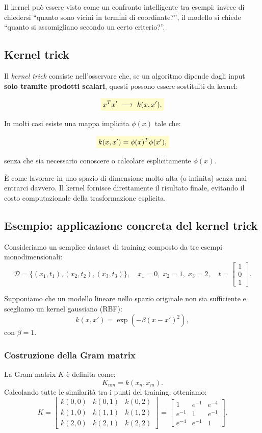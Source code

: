 \documentclass[a4paper,12pt]{report}
\newcommand{\highlight}[1]{%
\colorbox{yellow!20}{$\displaystyle #1$}%
}
\begin{document}
Il kernel può essere visto come un confronto intelligente tra esempi: invece di chiedersi “quanto sono vicini in termini di coordinate?”, il modello si chiede “quanto si assomigliano secondo un certo criterio?”.

\subsection{Kernel trick}

Il \emph{kernel trick} consiste nell’osservare che, se un algoritmo dipende dagli input \textbf{solo tramite prodotti scalari}, questi possono essere sostituiti da kernel:

\[
\highlight{
x^T x' \;\longrightarrow\; k(x,x').}
\]

In molti casi esiste una mappa implicita $\phi(x)$ tale che:

\[
\highlight{
k(x,x') = \phi(x)^T \phi(x'),}
\]

senza che sia necessario conoscere o calcolare esplicitamente $\phi(x)$.

È come lavorare in uno spazio di dimensione molto alta (o infinita) senza mai entrarci davvero. Il kernel fornisce direttamente il risultato finale, evitando il costo computazionale della trasformazione esplicita.

\subsection{Esempio: applicazione concreta del kernel trick}

Consideriamo un semplice dataset di training composto da tre esempi monodimensionali:
\[
\mathcal{D} = \{(x_1,t_1),(x_2,t_2),(x_3,t_3)\},
\quad
x_1=0,\; x_2=1,\; x_3=2,
\quad
t = \begin{bmatrix}1 \\ 0 \\ 1\end{bmatrix}.
\]

Supponiamo che un modello lineare nello spazio originale non sia sufficiente e scegliamo un kernel gaussiano (RBF):
\[
k(x,x') = \exp(-\beta (x-x')^2),
\]
con $\beta=1$.

\subsubsection*{Costruzione della Gram matrix}

La Gram matrix $K$ è definita come:
\[
K_{nm} = k(x_n,x_m).
\]
Calcolando tutte le similarità tra i punti del training, otteniamo:
\[
K =
\begin{bmatrix}
k(0,0) & k(0,1) & k(0,2) \\
k(1,0) & k(1,1) & k(1,2) \\
k(2,0) & k(2,1) & k(2,2)
\end{bmatrix}
=
\begin{bmatrix}
1 & e^{-1} & e^{-4} \\
e^{-1} & 1 & e^{-1} \\
e^{-4} & e^{-1} & 1
\end{bmatrix}.
\]
\end{document}
